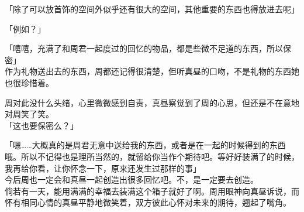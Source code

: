 「除了可以放首饰的空间外似乎还有很大的空间，其他重要的东西也得放进去呢」

「例如？」

「嘻嘻，充满了和周君一起度过的回忆的物品，都是些微不足道的东西，所以保密」\\

作为礼物送出去的东西，周都还记得很清楚，但听真昼的口吻，不是礼物的东西她也很珍惜着。

周对此没什么头绪，心里微微感到自责，真昼察觉到了周的心思，但还是不在意地对周笑了笑。\\

「这也要保密么？」

「嗯……大概真的是周君无意中送给我的东西，或者是在一起的时候得到的东西哦。所以不记得也是理所当然的，就留给你当作个期待吧。等好好装满了的时候，我再给你看，让你怀念一下，原来还发生过那样的事」\\

今后周也一定会和真昼一起创造出很多回忆吧。不，是一定要去创造。\\

倘若有一天，能用满满的幸福去装满这个箱子就好了啊。周用眼神向真昼诉说，而怀有相同心情的真昼平静地微笑着，双方彼此心怀对未来的期待，翘起了嘴角。
